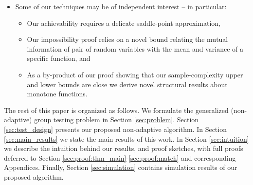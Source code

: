 \documentclass[onecolumn,letterpaper]{IEEEtran}
\newcommand{\cp}{{q}}
\newcommand{\fh}{{h(f)}}
\newcommand{\fH}{{H(f)}}
\newcommand{\ftau}{{\Gamma}}
\newcommand{\fT}{{\ftau(\cp)}}
\newcommand{\xw}[1]{\textcolor{cyan}{#1}}
\begin{document}
\begin{itemize}
\begin{itemize}
\item As a by-product we tightly characterize the heretofore open information-theoretic order-wise sample-complexity for the well-studied model of threshold group-testing.


\item  Perhaps surprisingly, for technical reason our results are somewhat weaker for general ``(one-sided) near-noiseless" test functions $f(\cdot)$ (i.e., either $f(0) \xrightarrow{d\rightarrow \infty} 0$, or $f(d)  \xrightarrow{d\rightarrow \infty} 1$, or both) than for general noisy test functions. For general near-noiseless test functions $f(\cdot)$ we show that $\frac{\fH}{\fh} \in {\cal O}(d^{1+o(1)})$. %

\item   We also demonstrate a ``natural" test-function $f(\cdot)$ whose sample complexity scales ``extremally" as $\Theta \left( d^2\log n\right)$ -- our results above exclude the possibility of any monotone test function having optimal sample-complexity higher than this. Note that the optimal sample-complexity scales as $\Theta ( d\log n)$ in the case of classical group-testing.
\end{itemize}
  

\item Some of our techniques may be of independent interest -- in particular: 
\begin{itemize} 
\item Our achievability requires a delicate saddle-point approximation,
\item Our impossibility proof relies on a novel bound relating the mutual information of pair of random variables with the mean and variance of a specific function, and
\item As a by-product of our proof showing that our sample-complexity upper and lower bounds are close we derive novel structural results about monotone functions.
\end{itemize}
\end{itemize}

The rest of this paper is organized as follows. We formulate the generalized (non-adaptive) group testing problem in Section \ref{sec:problem}. Section \ref{sec:test_design} presents our proposed non-adaptive algorithm. In Section \ref{sec:main_results} we state the main results of this work. In Section  \ref{sec:intuition} we describe the intuition behind our results, and proof sketches, with full proofs deferred to Section \ref{sec:proof:thm_main}-\ref{sec:proof:match} and corresponding Appendices. Finally, Section \ref{sec:simulation} contains simulation results of our proposed algorithm.
\end{document}
